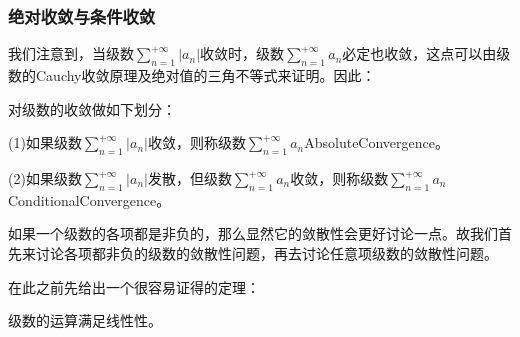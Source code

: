 \subsubsection{绝对收敛与条件收敛}
我们注意到，当级数$\sum\limits_{n=1}^{+\infty}|a_n|$收敛时，级数$\sum\limits_{n=1}^{+\infty}a_n$必定也收敛，这点可以由级数的Cauchy收敛原理及绝对值的三角不等式来证明。因此：
\begin{definition}
	对级数的收敛做如下划分：\par
	(1)如果级数$\sum\limits_{n=1}^{+\infty}|a_n|$收敛，则称级数$\sum\limits_{n=1}^{+\infty}a_n$\gls{AbsoluteConvergence}。\par
	(2)如果级数$\sum\limits_{n=1}^{+\infty}|a_n|$发散，但级数$\sum\limits_{n=1}^{+\infty}a_n$收敛，则称级数$\sum\limits_{n=1}^{+\infty}a_n$\gls{ConditionalConvergence}。
\end{definition}
如果一个级数的各项都是非负的，那么显然它的敛散性会更好讨论一点。故我们首先来讨论各项都非负的级数的敛散性问题，再去讨论任意项级数的敛散性问题。\par
在此之前先给出一个很容易证得的定理：
\begin{theorem}
	级数的运算满足线性性。
\end{theorem}





